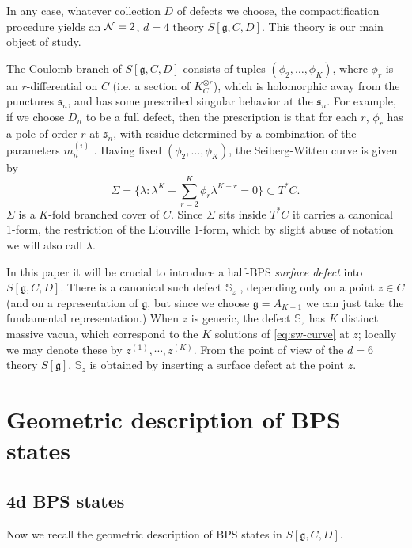 \documentclass[11pt,a4paper]{article}
\def\fg{\mathfrak{g}}
\def\CN{{\cal N}}
\def\CN {{\cal N}}
\newcommand{\ti}[1]{\textit{#1}}
\def\fg{\mathfrak{g}}
\def\fs{\mathfrak{s}}
\def\CN{{\cal N}}
\def\CN {{\cal N}}
\newcommand{\bS}{\mathbb S}
\begin{document}
In any case, whatever collection $D$ of defects we choose, the compactification procedure yields an $\CN=2$, $d=4$ theory $S[\fg, C, D]$.  This theory is our main object of study.

The Coulomb branch of $S[\fg, C, D]$ consists of tuples $(\phi_2, \dots, \phi_K)$, where $\phi_r$ is an $r$-differential
on $C$ (i.e. a section of $K_C^{\otimes r}$), which is holomorphic away from the punctures $\fs_n$, and has some prescribed singular behavior
at the $\fs_n$.  For example, if we choose $D_n$ to be a full defect,
then the prescription is that
for each $r$, $\phi_r$ has a pole of order $r$ at $\fs_n$, with residue determined by a combination of the parameters $m_n^{(i)}$ \cite{Gaiotto:2009we, Gaiotto:2009hg}.
Having fixed $(\phi_2, \dots, \phi_K)$, the Seiberg-Witten curve is given by
\begin{equation} \label{eq:sw-curve}
 \Sigma = \{ \lambda: \lambda^K + \sum_{r=2}^K \phi_r \lambda^{K-r} = 0 \} \subset T^* C.
\end{equation}
$\Sigma$ is a $K$-fold branched cover of $C$.
Since $\Sigma$ sits inside $T^* C$ it carries a canonical 1-form,
the restriction of the Liouville 1-form, which by slight abuse of notation
we will also call $\lambda$.

In this paper it will be crucial to introduce a half-BPS \ti{surface defect} into
$S[\fg, C, D]$.  There is a canonical such defect $\bS_z$ \cite{Alday:2009fs,Gaiotto:2009fs,Gaiotto:2011tf}, depending only on a point $z \in C$
(and on a representation of $\fg$, but since we choose $\fg = A_{K-1}$ we can just
take the fundamental representation.)  When $z$ is generic, the defect $\bS_z$
has $K$ distinct massive vacua, which correspond to the $K$ solutions of \eqref{eq:sw-curve} at $z$;
locally we may denote these by $z^{(1)}, \cdots, z^{(K)}$.
From the point of view of the
$d=6$ theory $S[\fg]$, $\bS_z$ is obtained by inserting a surface defect
at the point $z$.


\section{Geometric description of BPS states}

\subsection{4d BPS states}\label{subsec:4d-BPS-States}

Now we recall the geometric description of BPS states in $S[\fg, C, D]$.
\end{document}
